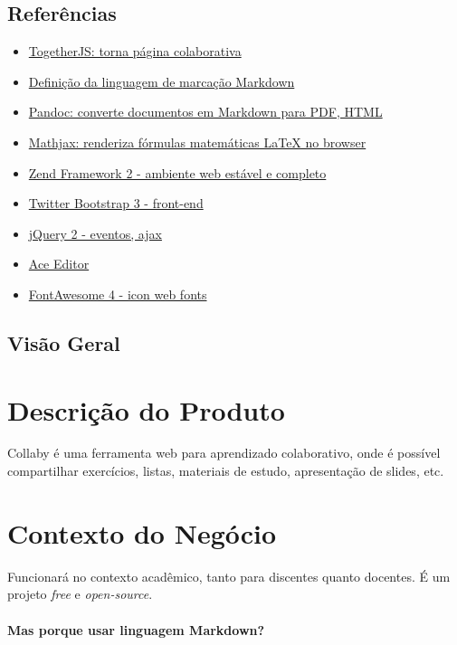 \subsection{Referências}

\begin{itemize}
\item
  \href{https://togetherjs.com/}{TogetherJS: torna página colaborativa}
\item
  \href{http://daringfireball.net/projects/markdown/dingus}{Definição da
  linguagem de marcação Markdown}
\item
  \href{http://johnmacfarlane.net/pandoc/}{Pandoc: converte documentos
  em Markdown para PDF, HTML}
\item
  \href{http://www.mathjax.org/}{Mathjax: renderiza fórmulas matemáticas
  LaTeX no browser}
\item
  \href{http://framework.zend.com/zf2}{Zend Framework 2 - ambiente web
  estável e completo}
\item
  \href{http://getbootstrap.com/}{Twitter Bootstrap 3 - front-end}
\item
  \href{http://jquery.com/}{jQuery 2 - eventos, ajax}
\item
  \href{http://ace.c9.io/\#nav=about}{Ace Editor}
\item
  \href{http://FontAwesome.github.io/}{FontAwesome 4 - icon web fonts}
\end{itemize}
\subsection{Visão Geral}

\section{Descrição do Produto}

Collaby é uma ferramenta web para aprendizado colaborativo, onde é
possível compartilhar exercícios, listas, materiais de estudo,
apresentação de slides, etc.

\section{Contexto do Negócio}

Funcionará no contexto acadêmico, tanto para discentes quanto docentes.
É um projeto \emph{free} e \emph{open-source}.

\paragraph{Mas porque usar linguagem Markdown?}

